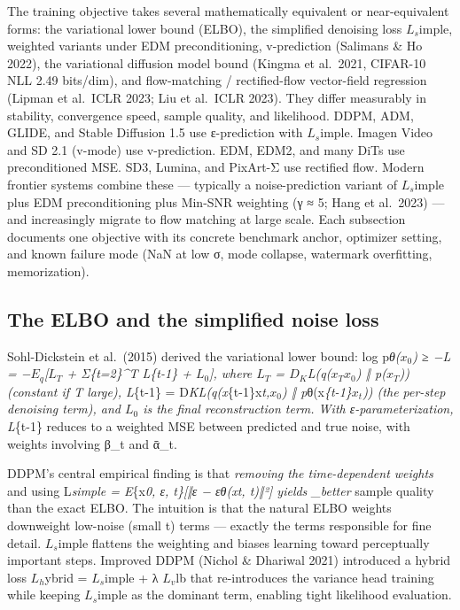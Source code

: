 The training objective takes several mathematically equivalent or near-equivalent forms: the variational lower bound (ELBO), the simplified denoising loss \(L_s\)imple, weighted variants under EDM preconditioning, v-prediction (Salimans \& Ho 2022), the variational diffusion model bound (Kingma et al.~2021, CIFAR-10 NLL 2.49 bits/dim), and flow-matching / rectified-flow vector-field regression (Lipman et al.~ICLR 2023; Liu et al.~ICLR 2023). They differ measurably in stability, convergence speed, sample quality, and likelihood. DDPM, ADM, GLIDE, and Stable Diffusion 1.5 use ε-prediction with \(L_s\)imple. Imagen Video and SD 2.1 (v-mode) use v-prediction. EDM, EDM2, and many DiTs use preconditioned MSE. SD3, Lumina, and PixArt-Σ use rectified flow. Modern frontier systems combine these --- typically a noise-prediction variant of \(L_s\)imple plus EDM preconditioning plus Min-SNR weighting (γ ≈ 5; Hang et al.~2023) --- and increasingly migrate to flow matching at large scale. Each subsection documents one objective with its concrete benchmark anchor, optimizer setting, and known failure mode (NaN at low σ, mode collapse, watermark overfitting, memorization).

\subsection{The ELBO and the simplified noise loss}\label{the-elbo-and-the-simplified-noise-loss}

Sohl-Dickstein et al.~(2015) derived the variational lower bound: log p\emph{θ(\(x_0\)) ≥ −L = −\(E_q\){[}\(L_T\) + Σ\emph{\{t=2\}\^{}T L}\{t-1\} + \(L_0\){]}, where \(L_T\) = \(D_K\)L(q(\(x_T\)\textbar{}\(x_0\)) ‖ p(\(x_T\))) (constant if T large), L}\{t-1\} = D\emph{KL(q(x}\{t-1\}\textbar x\emph{t,\(x_0\)) ‖ p}θ(x\emph{\{t-1\}\textbar{}\(x_t\))) (the per-step denoising term), and \(L_0\) is the final reconstruction term. With ε-parameterization, L}\{t-1\} reduces to a weighted MSE between predicted and true noise, with weights involving β\_t and ᾱ\_t.

DDPM's central empirical finding is that \emph{removing the time-dependent weights} and using L\emph{simple = E}\{x\emph{0, ε, t\}{[}‖ε − ε\emph{θ(x}t, t)‖²{]} yields \_better} sample quality than the exact ELBO. The intuition is that the natural ELBO weights downweight low-noise (small t) terms --- exactly the terms responsible for fine detail. \(L_s\)imple flattens the weighting and biases learning toward perceptually important steps. Improved DDPM (Nichol \& Dhariwal 2021) introduced a hybrid loss \(L_h\)ybrid = \(L_s\)imple + λ \(L_v\)lb that re-introduces the variance head training while keeping \(L_s\)imple as the dominant term, enabling tight likelihood evaluation.

